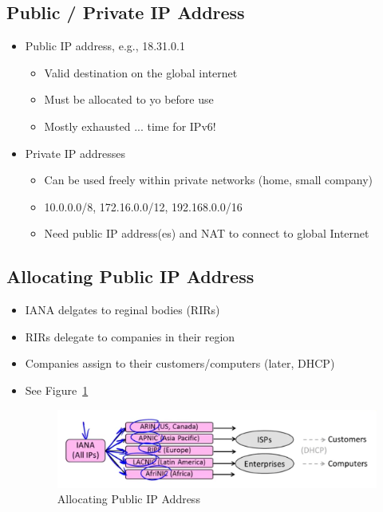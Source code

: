 \documentclass[12pt]{ctexart}   %
\begin{document}
	\subsection{Public / Private IP Address}
	\begin{itemize}
		\item Public IP address, e.g., 18.31.0.1
		\begin{itemize}
			\item Valid destination on the global internet
			\item Must be allocated to yo before use
			\item Mostly exhausted ... time for IPv6!
		\end{itemize}
		
		\item Private IP addresses
		\begin{itemize}
			\item Can be used freely within private networks (home, small company)
			\item 10.0.0.0/8, 172.16.0.0/12, 192.168.0.0/16
			\item Need public IP address(es) and NAT to connect to global Internet
		\end{itemize}
	\end{itemize}
	
	\subsection{Allocating Public IP Address}
	\begin{itemize}
		\item IANA delgates to reginal bodies (RIRs)
		\item RIRs delegate to companies in their region
		\item Companies assign to their customers/computers (later, DHCP)
		\item See Figure~\ref{fig:4-4-7}
		
		\begin{figure}[h!] %
		\centering
		 \includegraphics[scale=0.7]{images/4-4-7}
		\caption{Allocating Public IP Address}
		 \label{fig:4-4-7}
		 \end{figure}	
	\end{itemize}
\end{document}
